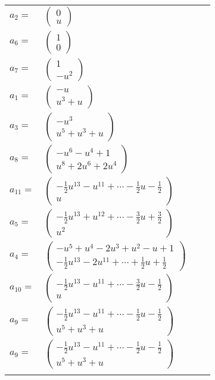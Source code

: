 \documentclass[1p]{elsarticle_modified}
\theoremstyle{definition}
\begin{document}
\begin{tabular}{m{7pt} m{180pt} m{7pt} m{180pt} }
\flushright $a_{2}=$&$\begin{pmatrix}0\\u\end{pmatrix}$ \\
\flushright $a_{6}=$&$\begin{pmatrix}1\\0\end{pmatrix}$ \\
\flushright $a_{7}=$&$\begin{pmatrix}1\\- u^2\end{pmatrix}$ \\
\flushright $a_{1}=$&$\begin{pmatrix}- u\\u^3+u\end{pmatrix}$ \\
\flushright $a_{3}=$&$\begin{pmatrix}- u^3\\u^5+u^3+u\end{pmatrix}$ \\
\flushright $a_{8}=$&$\begin{pmatrix}- u^6- u^4+1\\u^8+2 u^6+2 u^4\end{pmatrix}$ \\
\flushright $a_{11}=$&$\begin{pmatrix}-\frac{1}{2} u^{13}- u^{11}+\cdots-\frac{1}{2} u-\frac{1}{2}\\u\end{pmatrix}$ \\
\flushright $a_{5}=$&$\begin{pmatrix}-\frac{1}{2} u^{13}+u^{12}+\cdots-\frac{3}{2} u+\frac{3}{2}\\u^2\end{pmatrix}$ \\
\flushright $a_{4}=$&$\begin{pmatrix}- u^5+u^4-2 u^3+u^2- u+1\\-\frac{1}{2} u^{13}-2 u^{11}+\cdots+\frac{1}{2} u+\frac{1}{2}\end{pmatrix}$ \\
\flushright $a_{10}=$&$\begin{pmatrix}-\frac{1}{2} u^{13}- u^{11}+\cdots-\frac{3}{2} u-\frac{1}{2}\\u\end{pmatrix}$ \\
\flushright $a_{9}=$&$\begin{pmatrix}-\frac{1}{2} u^{13}- u^{11}+\cdots-\frac{1}{2} u-\frac{1}{2}\\u^5+u^3+u\end{pmatrix}$\\ \flushright $a_{9}=$&$\begin{pmatrix}-\frac{1}{2} u^{13}- u^{11}+\cdots-\frac{1}{2} u-\frac{1}{2}\\u^5+u^3+u\end{pmatrix}$\\&\end{tabular}
\end{document}

